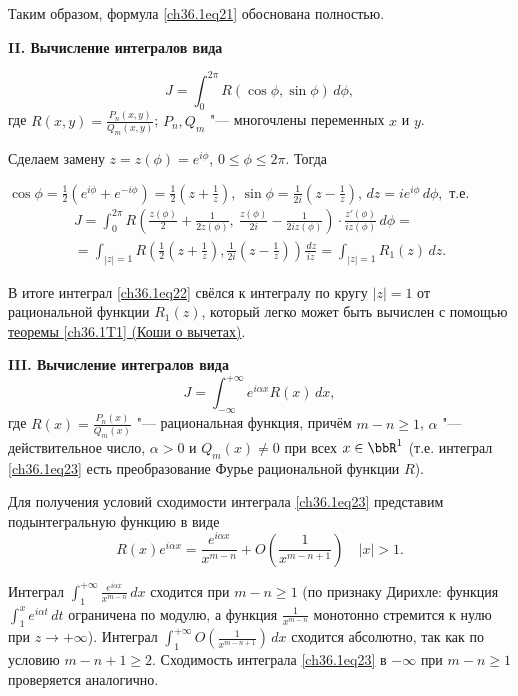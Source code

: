 Таким образом, формула \eqref{ch36.1eq21} обоснована полностью.

{\bf II. Вычисление интегралов вида}

\begin{equation} \label{ch36.1eq22}
J = \int_{0}^{2\pi} R(\cos \phi, \sin\phi)\,d\phi,
\end{equation}
где $R(x,y) = \frac{P_n(x,y)}{Q_m(x,y)}$; $P_n, Q_m$ "--- многочлены переменных $x$ и $y$.

Сделаем замену $z = z(\phi) = e^{i \phi}$, $0 \le \phi \le 2\pi$. Тогда 

$\cos\phi = \frac{1}{2} (e^{i\phi} + e^{-i\phi}) = \frac{1}{2}\left( z + \frac{1}{z}\right), \: \sin\phi = \frac{1}{2i} \left(z - \frac{1}{z} \right), \,dz = i e^{i \phi} \,d\phi,$ т.е. 
\begin{multline*}
J = \int_0^{2\pi} R\left( \frac{z(\phi)}{2} + \frac{1}{2z(\phi)}, \: \frac{z(\phi)}{2i} - \frac{1}{2iz(\phi)}\right) \cdot \frac{z'(\phi)}{iz(\phi)} \,d\phi =\\= \int_{|z| = 1} R\left( \frac{1}{2} \left( z + \frac{1}{z}\right), \frac{1}{2i}\left( z - \frac{1}{z}\right)\right)\frac{\,dz}{iz} = \int_{|z| = 1} R_1(z)\,dz.
\end{multline*}

В итоге интеграл \eqref{ch36.1eq22} свёлся к интегралу по кругу $|z| = 1$ от рациональной функции $R_1(z)$, который легко может быть вычислен с помощью  \hyperref[ch36.1T1]{теоремы \ref{ch36.1T1} (Коши о вычетах)}.

{\bf III. Вычисление интегралов вида}
\begin{equation} \label{ch36.1eq23}
J = \int_{-\infty}^{+\infty} e^{i\alpha x} R(x) \,dx,
\end{equation}
где $R(x) = \frac{P_n(x)}{Q_m(x)}$ "--- рациональная функция, причём $m - n \ge 1$, $\alpha$ "--- действительное число, $\alpha > 0$ и $Q_m(x) \not= 0$ при всех $x \in \bbR^1$ (т.е. интеграл \eqref{ch36.1eq23} есть преобразование Фурье рациональной функции $R$).

Для получения условий сходимости интеграла \eqref{ch36.1eq23} представим подынтегральную функцию в виде
$$
R(x) e^{i \alpha x} = \frac{e^{i \alpha x}}{x^{m - n}} + O \left( \frac{1}{x^{m - n + 1}} \right) \quad |x| > 1.
$$

Интеграл $\int_1^{+\infty} \frac{e^{i \alpha x}}{x^{m - n}} \,dx$ сходится при $m - n \ge 1$ (по признаку Дирихле: функция $\int_1^x e^{i\alpha t}\,dt$ ограничена по модулю, а функция $\frac{1}{x^{m - n}}$ монотонно стремится к нулю при $z \to +\infty$). Интеграл 
$\int_{1}^{+\infty} O \left( \frac{1}{x^{m - n + 1}} \right)\,dx$ сходится абсолютно, так как по условию $m - n + 1 \ge 2$. Сходимость интеграла \eqref{ch36.1eq23} в $-\infty$ при $m - n \ge 1$ проверяется аналогично.

